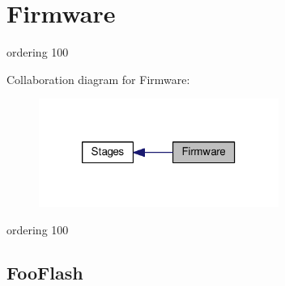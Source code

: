 \hypertarget{group__Firmware}{\section{Firmware}
\label{group__Firmware}
}


ordering 100  


Collaboration diagram for Firmware\-:
\nopagebreak
\begin{figure}[H]
\begin{center}
\leavevmode
\includegraphics[width=222pt]{group__Firmware}
\end{center}
\end{figure}
ordering 100 \hypertarget{FooFlash.py_FooFlash}{}\subsection{Foo\-Flash}\label{FooFlash.py_FooFlash}
